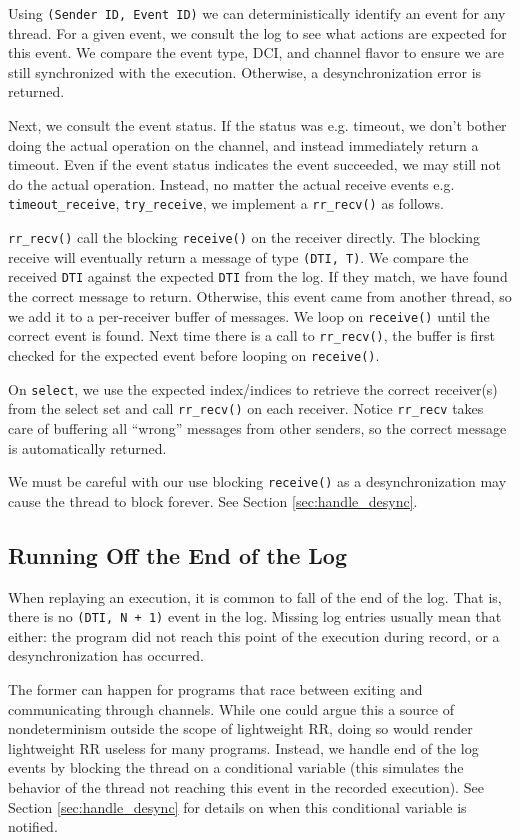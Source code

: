 \documentclass{article}
\begin{document}
Using \texttt{(Sender ID, Event ID)} we can deterministically identify an event for any thread.
For a given event, we consult the log to see what actions are expected for this event.
We compare the event type, DCI, and channel flavor to ensure we are still
synchronized with the execution. Otherwise, a desynchronization error is returned.

Next, we consult the event status. If the status was e.g. timeout, we don't bother
doing the actual operation on the channel, and instead immediately return a timeout.
Even if the event status indicates the event succeeded, we may still not
do the actual operation. Instead, no matter the actual receive events e.g.
\texttt{timeout\_receive}, \texttt{try\_receive},
we implement a \texttt{rr\_recv()} as follows.

\texttt{rr\_recv()} call the blocking \texttt{receive()} on the receiver directly.
The blocking receive will eventually return a message of type \texttt{(DTI, T)}. We
compare the received \texttt{DTI} against the expected \texttt{DTI} from the log.
If they match,
we have found the correct message to return. Otherwise, this event came from another
thread, so we add it to a per-receiver buffer of messages. We loop on \texttt{receive()}
until the correct event is found. Next time there is a call to \texttt{rr\_recv()},
the buffer is first checked for the expected event before looping on \texttt{receive()}.

On \texttt{select}, we use the expected index/indices to retrieve the correct receiver(s)
from the select set and call \texttt{rr\_recv()} on each receiver. Notice \texttt{rr\_recv}
takes care of buffering all ``wrong'' messages from other senders, so the correct message
is automatically returned.

We must be careful with our use blocking \texttt{receive()} as a desynchronization may
cause the thread to block forever. See Section \ref{sec:handle_desync}.

\subsection{Running Off the End of the Log}
When replaying an execution, it is common to fall of the end of the log. That is,
there is no \texttt{(DTI, N + 1)} event in the log. Missing log entries usually mean
that either: the program did not reach this point of the execution during record, or a desynchronization has occurred.

The former can happen for programs that race between exiting and communicating through
channels. While one could argue this a source of nondeterminism outside the scope of
lightweight RR, doing so would render lightweight RR useless for many programs.
Instead, we handle end of the log events by blocking the thread on a conditional
variable (this simulates the behavior of the thread not reaching this event in the recorded execution). See Section \ref{sec:handle_desync} for details on when this conditional variable
is notified.
\end{document}
